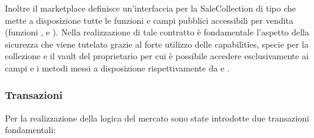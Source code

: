 Inoltre il marketplace definisce un'interfaccia per la SaleCollection di tipo  che mette a disposizione tutte le funzioni e campi pubblici accessibili per vendita (funzioni ,  e ). Nella realizzazione di tale contratto è fondamentale l'aspetto della sicurezza che viene tutelato grazie al forte utilizzo delle capabilities, specie per la collezione e il vault del proprietario per cui è possibile accedere esclusivamente ai campi e i metodi messi a disposizione rispettivamente da  e .

\subsubsection{Transazioni}
Per la realizzazione della logica del mercato sono state introdotte due transazioni fondamentali:
